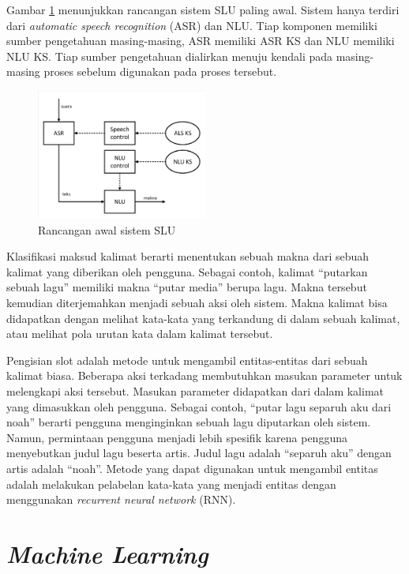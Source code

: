Gambar \ref{fig:slu_early} menunjukkan rancangan sistem SLU paling awal. Sistem hanya terdiri dari \textit{automatic speech recognition} (ASR) dan NLU. Tiap komponen memiliki sumber pengetahuan masing-masing, ASR memiliki ASR KS dan NLU memiliki NLU KS. Tiap sumber pengetahuan dialirkan menuju kendali pada masing-masing proses sebelum digunakan pada proses tersebut.

\begin{figure}[H]
	\centering
	\includegraphics[width=0.5\textwidth, trim=2 2 2 2, clip]{resources/2/early_slu.pdf}
	\caption{Rancangan awal sistem SLU \parencite{tur2011spoken}}
	\label{fig:slu_early}
\end{figure}

Klasifikasi maksud kalimat berarti menentukan sebuah makna dari sebuah kalimat yang diberikan oleh pengguna. Sebagai contoh, kalimat “putarkan sebuah lagu” memiliki makna “putar media” berupa lagu. Makna tersebut kemudian diterjemahkan menjadi sebuah aksi oleh sistem. Makna kalimat bisa didapatkan dengan melihat kata-kata yang terkandung di dalam sebuah kalimat, atau melihat pola urutan kata dalam kalimat tersebut.

Pengisian slot adalah metode untuk mengambil entitas-entitas dari sebuah kalimat biasa. Beberapa aksi terkadang membutuhkan masukan parameter untuk melengkapi aksi tersebut. Masukan parameter didapatkan dari dalam kalimat yang dimasukkan oleh pengguna. Sebagai contoh, “putar lagu separuh aku dari noah” berarti pengguna menginginkan sebuah lagu diputarkan oleh sistem. Namun, permintaan pengguna menjadi lebih spesifik karena pengguna menyebutkan judul lagu beserta artis. Judul lagu adalah “separuh aku” dengan artis adalah “noah”. Metode yang dapat digunakan untuk mengambil entitas adalah melakukan pelabelan kata-kata yang menjadi entitas dengan menggunakan \textit{recurrent neural network} (RNN).

\section{\textit{Machine Learning}}

